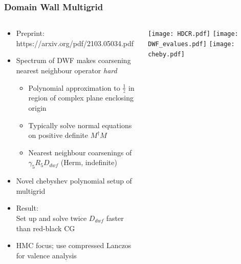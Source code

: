 \documentclass[pdf,ps,8pt]{beamer}
\begin{document}
\begin{frame}[fragile]\small\frametitle{Domain Wall Multigrid}

  \small
  \begin{columns}
  \begin{column}{0.6\textwidth}
  \begin{itemize} 
  \item Preprint: https://arxiv.org/pdf/2103.05034.pdf
  \item Spectrum of DWF makes coarsening nearest neighbour operator \emph{hard}
  \begin{itemize} 
  \item Polynomial approximation to $\frac{1}{z}$ in region of complex plane enclosing origin
  \item Typically solve normal equations on positive definite $M^\dagger M$
  \item Nearest neighbour coarsenings of $\gamma_5 R_5 D_{dwf}$ (Herm, indefinite)
    \end{itemize}
  \item Novel chebyshev polynomial setup of multigrid
  \item Result: \\Set up and solve twice $D_{dwf}$ faster than red-black CG
  \item HMC focus; use compressed Lanczos for valence analysis
  \end{itemize}

\end{column}
\begin{column}{0.4\textwidth}

  \texttt{[image: HDCR.pdf]}
  \texttt{[image: DWF\_evalues.pdf]}
  \texttt{[image: cheby.pdf]}

\end{column}
\end{columns}
\end{frame}
\end{document}
